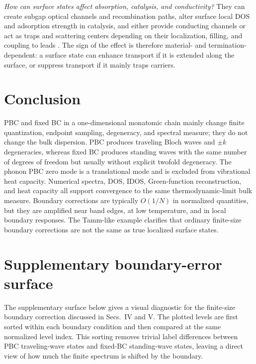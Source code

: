 ﻿\documentclass[a4paper,aps,prb,reprint,floatfix,nofootinbib,longbibliography]{revtex4-2}
\begin{document}
\textit{How can surface states affect absorption, catalysis, and conductivity?}  They can create subgap optical channels and recombination paths, alter surface local DOS and adsorption strength in catalysis, and either provide conducting channels or act as traps and scattering centers depending on their localization, filling, and coupling to leads \cite{Davison,Datta}.  The sign of the effect is therefore material- and termination-dependent: a surface state can enhance transport if it is extended along the surface, or suppress transport if it mainly traps carriers.

\section{Conclusion}

PBC and fixed BC in a one-dimensional monatomic chain mainly change finite quantization, endpoint sampling, degeneracy, and spectral measure; they do not change the bulk dispersion.  PBC produces traveling Bloch waves and \(\pm k\) degeneracies, whereas fixed BC produces standing waves with the same number of degrees of freedom but usually without explicit twofold degeneracy.  The phonon PBC zero mode is a translational mode and is excluded from vibrational heat capacity.  Numerical spectra, DOS, IDOS, Green-function reconstruction, and heat capacity all support convergence to the same thermodynamic-limit bulk measure.  Boundary corrections are typically \(O(1/N)\) in normalized quantities, but they are amplified near band edges, at low temperature, and in local boundary responses.  The Tamm-like example clarifies that ordinary finite-size boundary corrections are not the same as true localized surface states.

\clearpage
\onecolumngrid
\appendix

\section{Supplementary boundary-error surface}

The supplementary surface below gives a visual diagnostic for the finite-size boundary correction discussed in Secs.~IV and V.  The plotted levels are first sorted within each boundary condition and then compared at the same normalized level index.  This sorting removes trivial label differences between PBC traveling-wave states and fixed-BC standing-wave states, leaving a direct view of how much the finite spectrum is shifted by the boundary.
\end{document}

